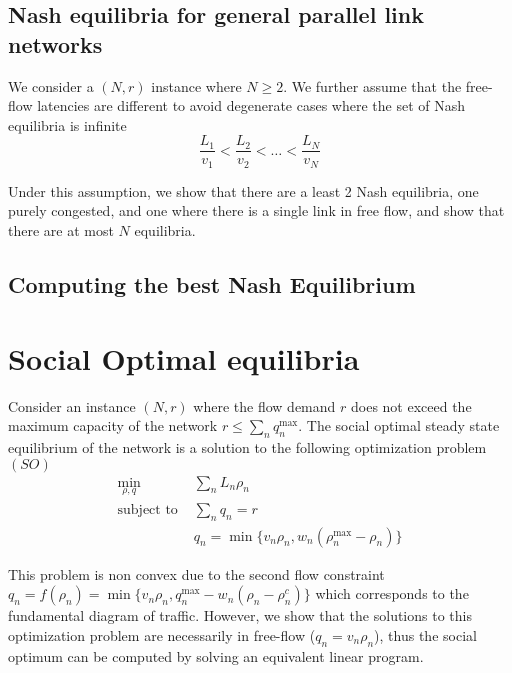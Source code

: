 \subsection{Nash equilibria for general parallel link networks}
We consider a $(N, r)$ instance where $N \geq 2$. We further assume that the free-flow latencies are different to avoid degenerate cases where the set of Nash equilibria is infinite
\[
\frac{L_1}{v_1} < \frac{L_2}{v_2} < \dots < \frac{L_N}{v_N}
\]

Under this assumption, we show that there are a least 2 Nash equilibria, one purely congested, and one where there is a single link in free flow, and show that there are at most $N$ equilibria.


\subsection{Computing the best Nash Equilibrium}



\section{Social Optimal equilibria}
Consider an instance $(N, r)$ where the flow demand $r$ does not exceed the maximum capacity of the network $r \leq \sum_n q_n^{\max}$. The social optimal steady state equilibrium of the network is a solution to the following optimization problem $(SO)$
\begin{align*}
\min_{\rho, q}  &\sum_n L_n \rho_n\\
\text{subject to }
& \sum_n q_n = r\\
& q_n = \min \{ v_n \rho_n, w_n(\rho_n^{\max} - \rho_n )\}
\end{align*}

This problem is non convex due to the second flow constraint $q_n = f(\rho_n) = \min \{ v_n \rho_n, q_n^{\max} - w_n(\rho_n - \rho_n^c)\}$
which corresponds to the fundamental diagram of traffic. However, we show that the solutions to this optimization problem are necessarily in free-flow ($q_n = v_n \rho_n$), thus the social optimum can be computed by solving an equivalent linear program.


